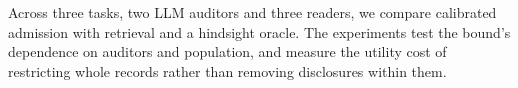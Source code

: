 Across three tasks, two LLM auditors and three readers, we compare calibrated
admission with retrieval and a hindsight oracle. The experiments test the
bound's dependence on auditors and population, and measure the utility cost
of restricting whole records rather than removing disclosures within them.
